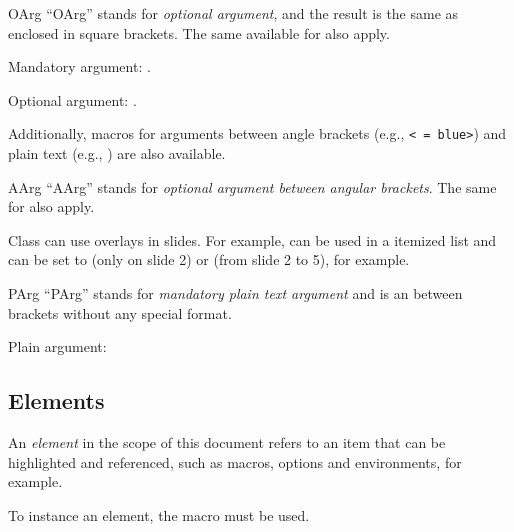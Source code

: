 \documentclass[11pt]{article}
\begin{document}
\begin{Macrodef}{OArg}{}{}
    ``OArg'' stands for \textit{optional argument}, and the result is the same as  enclosed in square brackets. The same  available for  also apply.
\end{Macrodef}

\begin{PDExample}
    Mandatory argument: .\par
    Optional argument: .
\end{PDExample}

Additionally, macros for arguments between angle brackets (e.g., \texttt{< = blue>}) and plain text (e.g., ) are also available.

\begin{Macrodef}{AArg}{}{}
    ``AArg'' stands for \textit{optional argument between angular brackets}. The same  for  also apply.
\end{Macrodef}

\begin{PDExample}
    Class  can use overlays in slides. For example,  can be used in a itemized list and  can be set to  (only on slide 2) or  (from slide 2 to 5), for example.
\end{PDExample}

\begin{Macrodef}{PArg}{}{}
    ``PArg'' stands for \textit{mandatory plain text argument} and is an  between brackets without any special format.
\end{Macrodef}

\begin{PDExample}
    Plain argument: 
\end{PDExample}

\subsection{Elements}

An \textit{element} in the scope of this document refers to an item that can be highlighted and referenced, such as macros, options and environments, for example.

To instance an element, the  macro must be used.
\end{document}
